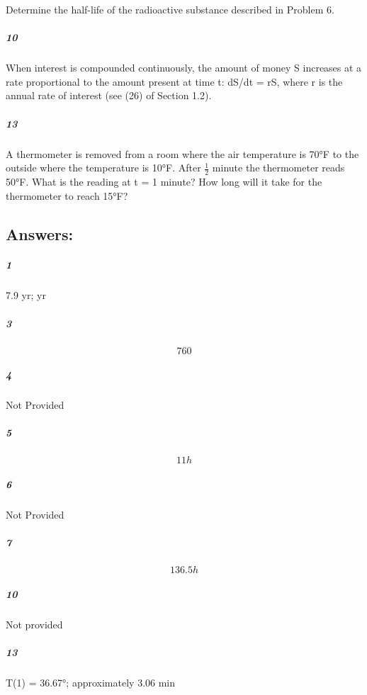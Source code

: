 \documentclass[fleqn]{article}
\begin{document}
Determine the half-life of the radioactive substance described in Problem 6.

\vfill


\pagebreak


\subparagraph{10}

When interest is compounded continuously, the amount of money S increases at a rate proportional to the amount present at time t: dS/dt = rS, where r is the annual rate of interest (see (26) of Section 1.2).

\vfill



\subparagraph{13}

A thermometer is removed from a room where the air temperature is 70°F to the outside where the temperature is 10°F. After $\frac{1}{2}$ minute the thermometer reads 50°F. What is the reading at t = 1 minute? How long will it take for the thermometer to reach 15°F?

\vfill


\pagebreak

\pagebreak
\subsection*{Answers:}


\subparagraph{1}

7.9 yr; yr 

\vfill



\subparagraph{3}

\[
760 
\]

\vfill



\subparagraph{4}

Not Provided

\vfill



\subparagraph{5}

\[
11 h 
\]

\vfill



\subparagraph{6}

Not Provided

\vfill



\subparagraph{7}

\[
136.5 h 
\]

\vfill



\subparagraph{10}

Not provided

\vfill



\subparagraph{13}

T(1) = 36.67°; approximately 3.06 min

\vfill
\end{document}
